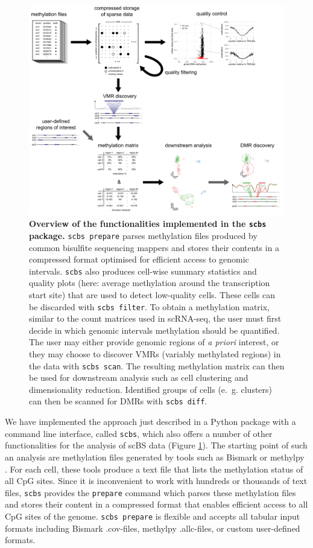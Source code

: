 \documentclass[twocolumn,10pt]{article}
\begin{document}
\begin{figure}[t]
    \begin{center}
        \includegraphics[width=.8\textwidth]{figures/Fig_workflow.png}
    \end{center}
    \caption{\small \textbf{Overview of the functionalities implemented in the \texttt{scbs} package.}
        \texttt{scbs prepare} parses methylation files produced by common bisulfite sequencing mappers and stores their contents in a compressed format optimised for efficient access to genomic intervals.
        \texttt{scbs} also produces cell-wise summary statistics and quality plots (here: average methylation around the transcription start site) that are used to detect low-quality cells.
        These cells can be discarded with \texttt{scbs filter}.
        To obtain a methylation matrix, similar to the count matrices used in scRNA-seq, the user must first decide in which genomic intervals methylation should be quantified.
        The user may either provide genomic regions of \emph{a priori} interest, or they may choose to discover VMRs (variably methylated regions) in the data with \texttt{scbs scan}.
        The resulting methylation matrix can then be used for downstream analysis such as cell clustering and dimensionality reduction.
        Identified groups of cells (e.~g. clusters) can then be scanned for DMRs with \texttt{scbs diff}.
    }
    \label{fig:workflow}
\end{figure}

We have implemented the approach just described in a Python package with a command line interface, called \texttt{scbs}, which also offers a number of other functionalities for the analysis of scBS data (Figure \ref{fig:workflow}).
The starting point of such an analysis are methylation files generated by tools such as Bismark \citep{bismark} or methylpy \citep{methylpy}.
For each cell, these tools produce a text file that lists the methylation status of all CpG sites.
Since it is inconvenient to work with hundreds or thousands of text files, \texttt{scbs} provides the \texttt{prepare} command which parses these methylation files and stores their content in a compressed format that enables efficient access to all CpG sites of the genome.
\texttt{scbs prepare} is flexible and accepts all tabular input formats including Bismark .cov-files, methylpy .allc-files, or custom user-defined formats.
\end{document}

